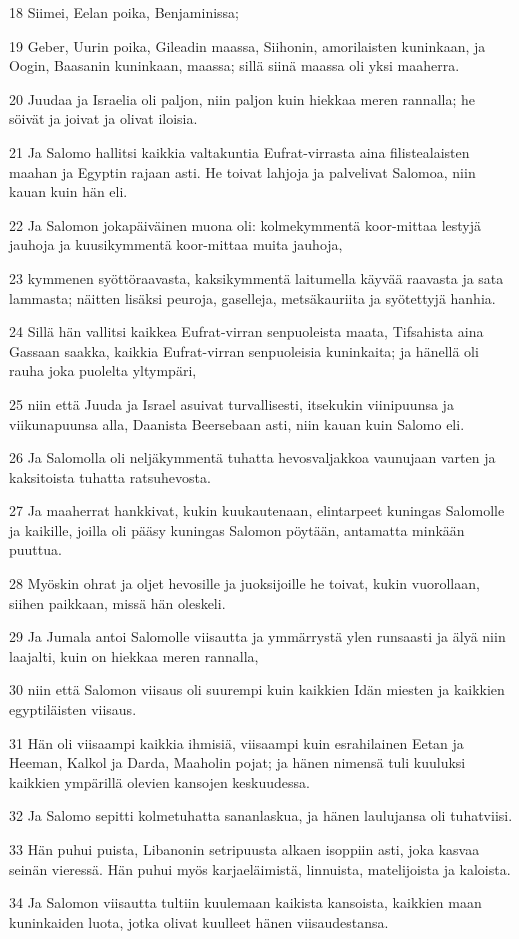 \par 18 Siimei, Eelan poika, Benjaminissa;
\par 19 Geber, Uurin poika, Gileadin maassa, Siihonin, amorilaisten kuninkaan, ja Oogin, Baasanin kuninkaan, maassa; sillä siinä maassa oli yksi maaherra.
\par 20 Juudaa ja Israelia oli paljon, niin paljon kuin hiekkaa meren rannalla; he söivät ja joivat ja olivat iloisia.
\par 21 Ja Salomo hallitsi kaikkia valtakuntia Eufrat-virrasta aina filistealaisten maahan ja Egyptin rajaan asti. He toivat lahjoja ja palvelivat Salomoa, niin kauan kuin hän eli.
\par 22 Ja Salomon jokapäiväinen muona oli: kolmekymmentä koor-mittaa lestyjä jauhoja ja kuusikymmentä koor-mittaa muita jauhoja,
\par 23 kymmenen syöttöraavasta, kaksikymmentä laitumella käyvää raavasta ja sata lammasta; näitten lisäksi peuroja, gaselleja, metsäkauriita ja syötettyjä hanhia.
\par 24 Sillä hän vallitsi kaikkea Eufrat-virran senpuoleista maata, Tifsahista aina Gassaan saakka, kaikkia Eufrat-virran senpuoleisia kuninkaita; ja hänellä oli rauha joka puolelta yltympäri,
\par 25 niin että Juuda ja Israel asuivat turvallisesti, itsekukin viinipuunsa ja viikunapuunsa alla, Daanista Beersebaan asti, niin kauan kuin Salomo eli.
\par 26 Ja Salomolla oli neljäkymmentä tuhatta hevosvaljakkoa vaunujaan varten ja kaksitoista tuhatta ratsuhevosta.
\par 27 Ja maaherrat hankkivat, kukin kuukautenaan, elintarpeet kuningas Salomolle ja kaikille, joilla oli pääsy kuningas Salomon pöytään, antamatta minkään puuttua.
\par 28 Myöskin ohrat ja oljet hevosille ja juoksijoille he toivat, kukin vuorollaan, siihen paikkaan, missä hän oleskeli.
\par 29 Ja Jumala antoi Salomolle viisautta ja ymmärrystä ylen runsaasti ja älyä niin laajalti, kuin on hiekkaa meren rannalla,
\par 30 niin että Salomon viisaus oli suurempi kuin kaikkien Idän miesten ja kaikkien egyptiläisten viisaus.
\par 31 Hän oli viisaampi kaikkia ihmisiä, viisaampi kuin esrahilainen Eetan ja Heeman, Kalkol ja Darda, Maaholin pojat; ja hänen nimensä tuli kuuluksi kaikkien ympärillä olevien kansojen keskuudessa.
\par 32 Ja Salomo sepitti kolmetuhatta sananlaskua, ja hänen laulujansa oli tuhatviisi.
\par 33 Hän puhui puista, Libanonin setripuusta alkaen isoppiin asti, joka kasvaa seinän vieressä. Hän puhui myös karjaeläimistä, linnuista, matelijoista ja kaloista.
\par 34 Ja Salomon viisautta tultiin kuulemaan kaikista kansoista, kaikkien maan kuninkaiden luota, jotka olivat kuulleet hänen viisaudestansa.

